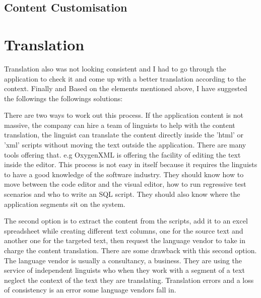 \documentclass[
	a4paper, %
	10pt, %
	unnumberedsections, %
	twoside, %
]{LTJournalArticle}
\begin{document}

\subsection{Content Customisation}
\section{Translation}

Translation also was not looking consistent and I had to go through the application to check it and come up with a better translation according to the context.
Finally and Based on the elements mentioned above, I have suggested the followings the followings solutions:

There are two ways to work out this process. If the application content is not massive, the company can hire a team of linguists to help with the content translation, the linguist can translate the content directly inside the 'html' or 'xml' scripts without moving the text outside the application. There are many tools offering that. e.g OxygenXML is offering the facility of editing the text inside the editor. This process is not easy in itself because it requires the linguists to have a good knowledge of the  software industry. They should know how to move between the code editor and the visual editor, how to run regressive test scenarios and who to write an SQL script. They should also know where the application segments sit on the system.

The second option is to extract the content from the scripts, add it to an excel spreadsheet while creating different text columns, one for the source text and another one for the targeted text, then request the language vendor to take in charge the content translation. There are some drawback with this second option. The language vendor is usually a consultancy, a business. They are using the service of independent linguists who when they work with a segment of a text neglect the context of the text they are translating. Translation errors and a loss of consistency is an error some language vendors fall in.
\end{document}
